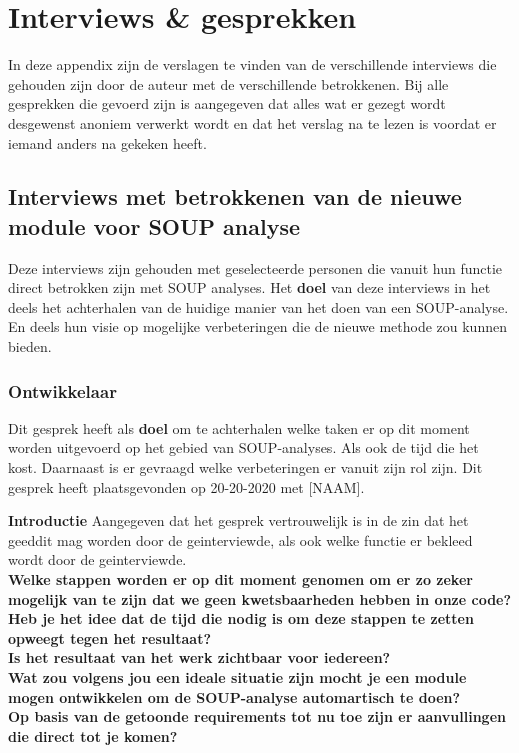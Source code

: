 
\chapter{Interviews \& gesprekken}\label{ch:Interviews}

In deze appendix zijn de verslagen te vinden van de verschillende interviews die gehouden zijn door de auteur met de verschillende betrokkenen. Bij alle gesprekken die gevoerd zijn is aangegeven dat alles wat er gezegt wordt desgewenst anoniem verwerkt wordt en dat het verslag na te lezen is voordat er iemand anders na gekeken heeft.
\section{Interviews met betrokkenen van de nieuwe module voor SOUP analyse}\label{sec:intake-gesprek-oprachtgever}
Deze interviews zijn gehouden met geselecteerde personen die vanuit hun functie direct betrokken zijn met SOUP analyses. Het \textbf{doel} van deze interviews in het deels het achterhalen van de huidige manier van het doen van een SOUP-analyse. En deels hun visie op mogelijke verbeteringen die de nieuwe methode zou kunnen bieden.

\subsection{Ontwikkelaar}\label{subsec:ontwikkelaar}
Dit gesprek heeft als \textbf{doel} om te achterhalen welke taken er op dit moment worden uitgevoerd op het gebied van SOUP-analyses. Als ook de tijd die het kost. Daarnaast is er gevraagd welke verbeteringen er vanuit zijn rol zijn. Dit gesprek heeft plaatsgevonden op 20-20-2020 met [NAAM].\smallskip

\textbf{Introductie }
Aangegeven dat het gesprek vertrouwelijk is in de zin dat het geeddit mag worden door de geinterviewde, als ook welke functie er bekleed wordt door de geinterviewde.
\lipsum[01]
\\
\textbf{Welke stappen worden er op dit moment genomen om er zo zeker mogelijk van te zijn dat we geen kwetsbaarheden hebben in onze code? }
\lipsum[01]
\\
\textbf{Heb je het idee dat de tijd die nodig is om deze stappen te zetten opweegt tegen het resultaat?}
\lipsum[01]
\\
\textbf{Is het resultaat van het werk zichtbaar voor iedereen?}
\lipsum[01]
\\
\textbf{Wat zou volgens jou een ideale situatie zijn mocht je een module mogen ontwikkelen om de SOUP-analyse automartisch te doen?  }
\lipsum[01]
\\
\textbf{Op basis van de getoonde requirements tot nu toe zijn er aanvullingen die direct tot je komen?}
\lipsum[01]
\\
